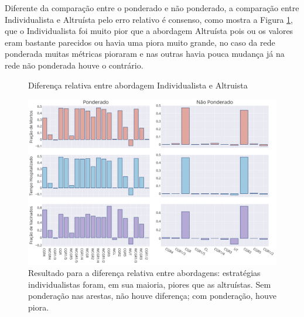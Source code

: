 Diferente da comparação entre o ponderado e não ponderado, a comparação entre Individualista e Altruísta pelo erro relativo é consenso, como mostra a Figura \ref{fig:compara_altruismo}, que o Individualista foi muito pior que a abordagem Altruísta pois ou os valores eram bastante parecidos ou havia uma piora muito grande, no caso da rede ponderada muitas métricas pioraram e nas outras havia pouca mudança já na rede não ponderada houve o contrário.

\begin{figure}[H]
    \centering
    \captionsetup{font=normalsize,skip=0.8pt,singlelinecheck=on,labelsep=endash}
    \caption{Diferença relativa entre abordagem Individualista e Altruista}
    
    \includegraphics[scale= 0.3]{figuras/compara_altruismo_0.0.png}
    \captionsetup{font=small,justification=justified}
    \caption*{Resultado para a diferença relativa entre abordagens: estratégias individualistas foram, em sua maioria, piores que as altruístas. Sem ponderação nas arestas, não houve diferença; com ponderação, houve piora.}
    \label{fig:compara_altruismo}
\end{figure}